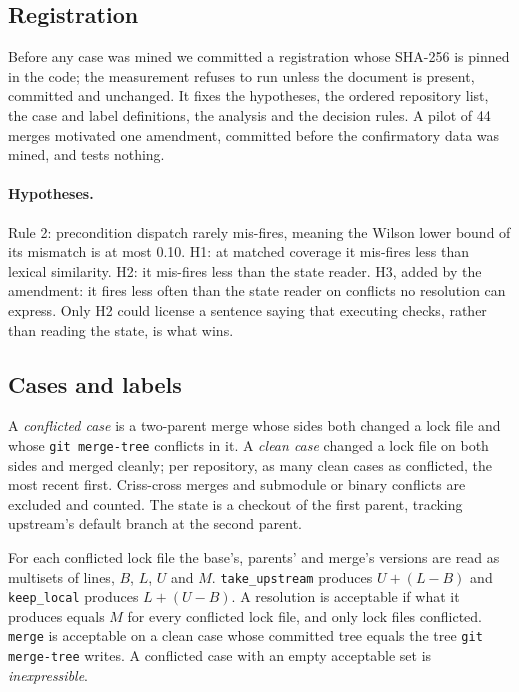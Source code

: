 \documentclass[11pt]{article}
\newcommand{\code}[1]{\texttt{#1}}
\begin{document}
\subsection{Registration}

Before any case was mined we committed a registration whose SHA-256 is pinned in the code; the
measurement refuses to run unless the document is present, committed and unchanged. It fixes the
hypotheses, the ordered repository list, the case and label definitions, the analysis and the
decision rules. A pilot of 44 merges motivated one amendment, committed before the confirmatory
data was mined, and tests nothing.

\paragraph{Hypotheses.}
Rule 2: precondition dispatch rarely mis-fires, meaning the Wilson lower bound of its mismatch is
at most 0.10. H1: at matched coverage it mis-fires less than lexical similarity. H2: it
mis-fires less than the state reader. H3, added by the amendment: it fires less often than the
state reader on conflicts no resolution can express. Only H2 could license a sentence saying
that executing checks, rather than reading the state, is what wins.

\subsection{Cases and labels}

A \emph{conflicted case} is a two-parent merge whose sides both changed a lock file and whose
\code{git merge-tree} conflicts in it. A \emph{clean case} changed a lock file on both sides and
merged cleanly; per repository, as many clean cases as conflicted, the most recent first.
Criss-cross merges and submodule or binary conflicts are excluded and counted. The state is a
checkout of the first parent, tracking upstream's default branch at the second parent.

For each conflicted lock file the base's, parents' and merge's versions are read as multisets of
lines, $B$, $L$, $U$ and $M$. \code{take\_upstream} produces $U+(L-B)$ and \code{keep\_local}
produces $L+(U-B)$. A resolution is acceptable if what it produces equals $M$ for every conflicted
lock file, and only lock files conflicted. \code{merge} is acceptable on a clean case whose
committed tree equals the tree \code{git merge-tree} writes. A conflicted case with an empty
acceptable set is \emph{inexpressible}.
\end{document}
